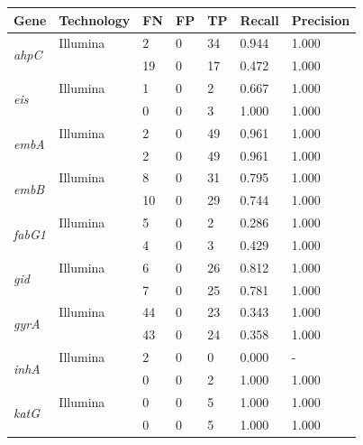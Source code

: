 \begin{table}
\centering
\begin{tabular}{@{}lllllll@{}}
\toprule
Gene                            & Technology & FN & FP & TP  & Recall & Precision \\ \midrule
\multirow{2}{*}{\textit{ahpC}}  & Illumina   & 2  & 0  & 34  & 0.944  & 1.000     \\
                                & \ont{}     & 19 & 0  & 17  & 0.472  & 1.000     \\ \cmidrule(l){2-7}
\multirow{2}{*}{\textit{eis}}   & Illumina   & 1  & 0  & 2   & 0.667  & 1.000     \\
                                & \ont{}     & 0  & 0  & 3   & 1.000  & 1.000     \\ \cmidrule(l){2-7}
\multirow{2}{*}{\textit{embA}}  & Illumina   & 2  & 0  & 49  & 0.961  & 1.000     \\
                                & \ont{}     & 2  & 0  & 49  & 0.961  & 1.000     \\ \cmidrule(l){2-7}
\multirow{2}{*}{\textit{embB}}  & Illumina   & 8  & 0  & 31  & 0.795  & 1.000     \\
                                & \ont{}     & 10 & 0  & 29  & 0.744  & 1.000     \\ \cmidrule(l){2-7}
\multirow{2}{*}{\textit{fabG1}} & Illumina   & 5  & 0  & 2   & 0.286  & 1.000     \\
                                & \ont{}     & 4  & 0  & 3   & 0.429  & 1.000     \\ \cmidrule(l){2-7}
\multirow{2}{*}{\textit{gid}}   & Illumina   & 6  & 0  & 26  & 0.812  & 1.000     \\
                                & \ont{}     & 7  & 0  & 25  & 0.781  & 1.000     \\ \cmidrule(l){2-7}
\multirow{2}{*}{\textit{gyrA}}  & Illumina   & 44 & 0  & 23  & 0.343  & 1.000     \\
                                & \ont{}     & 43 & 0  & 24  & 0.358  & 1.000     \\ \cmidrule(l){2-7}
\multirow{2}{*}{\textit{inhA}}  & Illumina   & 2  & 0  & 0   & 0.000  & -         \\
                                & \ont{}     & 0  & 0  & 2   & 1.000  & 1.000     \\ \cmidrule(l){2-7}
\multirow{2}{*}{\textit{katG}}  & Illumina   & 0  & 0  & 5   & 1.000  & 1.000     \\
                                & \ont{}     & 0  & 0  & 5   & 1.000  & 1.000     \\ \cmidrule(l){2-7}

\end{tabular}
\end{table}
